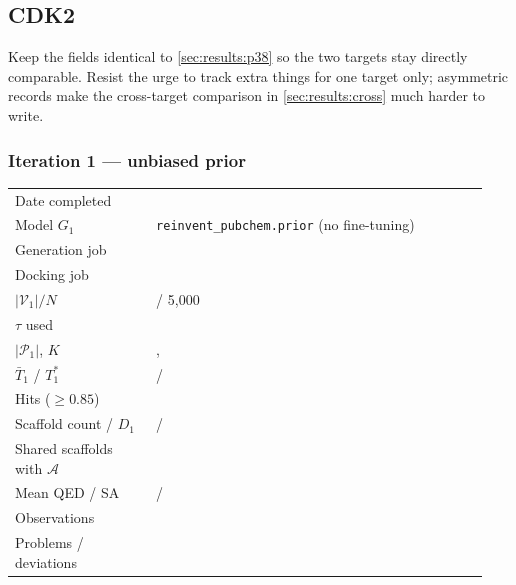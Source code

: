 \documentclass[11pt]{article}
\newcommand{\FILL}[1]{\textcolor{blue!65!black}{\underline{\textsf{#1}}}}
\newcommand{\Gmodel}{G}                         %
\newcommand{\Actives}{\mathcal{A}}              %
\newcommand{\Valid}{\mathcal{V}}                %
\newcommand{\Passed}{\mathcal{P}}               %
\newcommand{\Tbar}{\bar{T}}
\newcommand{\Tstar}{T^{*}}
\newcommand{\Ngen}{N}
\newcommand{\Kk}{K}
\begin{document}
\subsection{CDK2}
\label{sec:results:cdk2}

\begin{guide}
Keep the fields identical to \cref{sec:results:p38} so the two targets stay
directly comparable. Resist the urge to track extra things for one target only;
asymmetric records make the cross-target comparison in
\cref{sec:results:cross} much harder to write.
\end{guide}

\subsubsection*{Iteration 1 --- unbiased prior}
\begin{guide}[Log]
\begin{tabular}{@{}p{0.28\linewidth}p{0.66\linewidth}@{}}
Date completed        & \FILL{} \\
Model $\Gmodel_1$     & \texttt{reinvent\_pubchem.prior} (no fine-tuning) \\
Generation job        & \FILL{} \\
Docking job           & \FILL{} \\
$|\Valid_1| / \Ngen$  & \FILL{} / 5{,}000 \\
$\tau$ used           & \FILL{} \\
$|\Passed_1|$, $\Kk$  & \FILL{} , \FILL{} \\
$\Tbar_1$ / $\Tstar_1$& \FILL{} / \FILL{} \\
Hits ($\ge 0.85$)     & \FILL{} \\
Scaffold count / $D_1$& \FILL{} / \FILL{} \\
Shared scaffolds with $\Actives$ & \FILL{} \\
Mean QED / SA         & \FILL{} / \FILL{} \\
Observations          & \FILL{} \\
Problems / deviations & \FILL{} \\
\end{tabular}
\end{guide}
\end{document}
